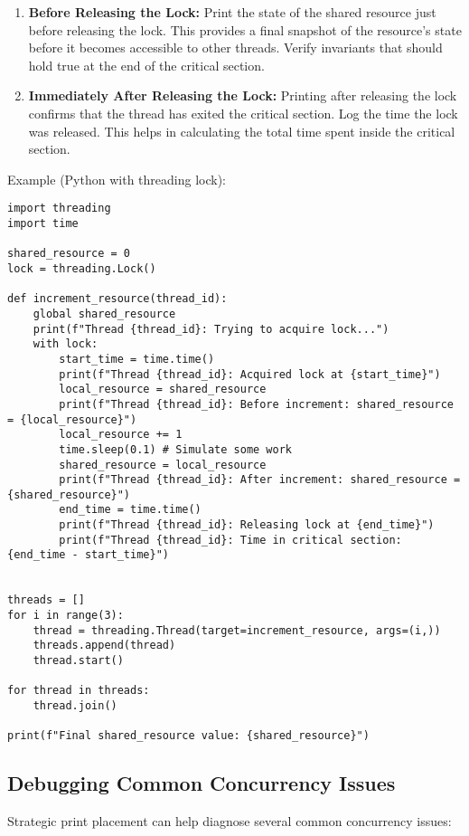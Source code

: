 \documentclass{article}
\begin{document}
{{{\begin{enumerate}
    \item \textbf{Before Releasing the Lock:} Print the state of the shared resource just before releasing the lock. This provides a final snapshot of the resource's state before it becomes accessible to other threads. Verify invariants that should hold true at the end of the critical section.

    \item \textbf{Immediately After Releasing the Lock:}  Printing after releasing the lock confirms that the thread has exited the critical section. Log the time the lock was released. This helps in calculating the total time spent inside the critical section.
\end{enumerate}

Example (Python with threading lock):

\begin{verbatim}
import threading
import time

shared_resource = 0
lock = threading.Lock()

def increment_resource(thread_id):
    global shared_resource
    print(f"Thread {thread_id}: Trying to acquire lock...")
    with lock:
        start_time = time.time()
        print(f"Thread {thread_id}: Acquired lock at {start_time}")
        local_resource = shared_resource
        print(f"Thread {thread_id}: Before increment: shared_resource = {local_resource}")
        local_resource += 1
        time.sleep(0.1) # Simulate some work
        shared_resource = local_resource
        print(f"Thread {thread_id}: After increment: shared_resource = {shared_resource}")
        end_time = time.time()
        print(f"Thread {thread_id}: Releasing lock at {end_time}")
        print(f"Thread {thread_id}: Time in critical section: {end_time - start_time}")


threads = []
for i in range(3):
    thread = threading.Thread(target=increment_resource, args=(i,))
    threads.append(thread)
    thread.start()

for thread in threads:
    thread.join()

print(f"Final shared_resource value: {shared_resource}")

\end{verbatim}

\subsection*{Debugging Common Concurrency Issues}

Strategic print placement can help diagnose several common concurrency issues:

}}}
\end{document}
